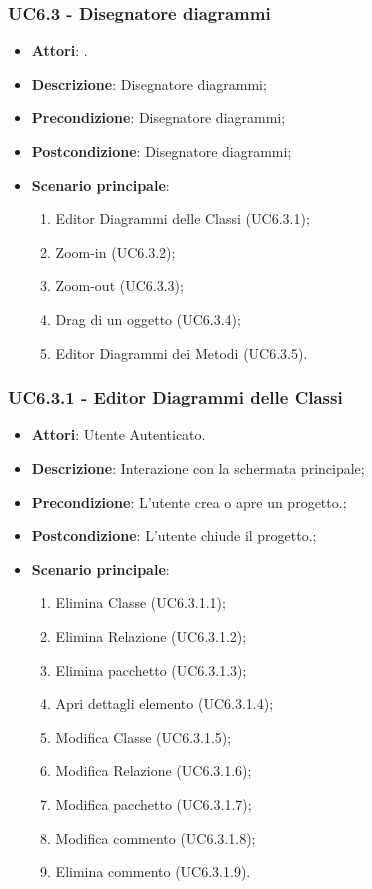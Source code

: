 \subsubsection{UC6.3 - Disegnatore diagrammi} 
\label{sssec:UC6.3} 
\begin{itemize} 
\item \textbf{Attori}: .
\item \textbf{Descrizione}: Disegnatore diagrammi;
\item \textbf{Precondizione}: Disegnatore diagrammi;
\item \textbf{Postcondizione}: Disegnatore diagrammi;
\item \textbf{Scenario principale}: \begin{enumerate}\item Editor Diagrammi delle Classi (UC6.3.1);\item Zoom-in (UC6.3.2);\item Zoom-out (UC6.3.3);\item Drag di un oggetto (UC6.3.4);\item Editor Diagrammi dei Metodi (UC6.3.5). 
 \end{enumerate}
\end{itemize} 
\subsubsection{UC6.3.1 - Editor Diagrammi delle Classi} 
\label{sssec:UC6.3.1} 
\begin{itemize} 
\item \textbf{Attori}: Utente Autenticato.
\item \textbf{Descrizione}: Interazione con la schermata principale;
\item \textbf{Precondizione}: L'utente crea o apre un progetto.;
\item \textbf{Postcondizione}: L'utente chiude il progetto.;
\item \textbf{Scenario principale}: \begin{enumerate}\item Elimina Classe (UC6.3.1.1);\item Elimina Relazione (UC6.3.1.2);\item Elimina pacchetto (UC6.3.1.3);\item Apri dettagli elemento (UC6.3.1.4);\item Modifica Classe (UC6.3.1.5);\item Modifica Relazione (UC6.3.1.6);\item Modifica pacchetto (UC6.3.1.7);\item Modifica commento (UC6.3.1.8);\item Elimina commento (UC6.3.1.9). 
 \end{enumerate}
\end{itemize} 
